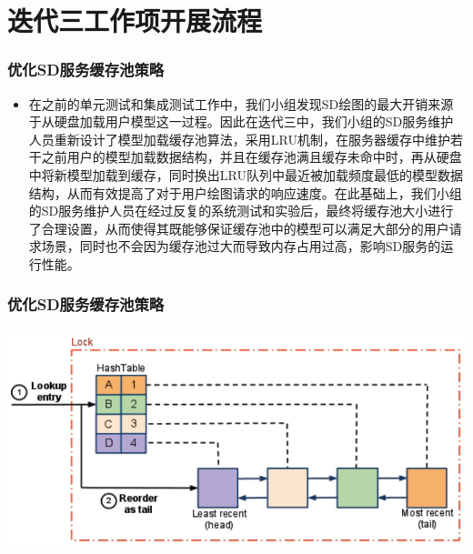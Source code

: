 \section{迭代三工作项开展流程}
\begin{frame}
    \frametitle{优化SD服务缓存池策略}
    \begin{itemize}
        \item 在之前的单元测试和集成测试工作中，我们小组发现SD绘图的最大开销来源于从硬盘加载用户模型这一过程。因此在迭代三中，我们小组的SD服务维护人员重新设计了模型加载缓存池算法，采用LRU机制，在服务器缓存中维护若干之前用户的模型加载数据结构，并且在缓存池满且缓存未命中时，再从硬盘中将新模型加载到缓存，同时换出LRU队列中最近被加载频度最低的模型数据结构，从而有效提高了对于用户绘图请求的响应速度。在此基础上，我们小组的SD服务维护人员在经过反复的系统测试和实验后，最终将缓存池大小进行了合理设置，从而使得其既能够保证缓存池中的模型可以满足大部分的用户请求场景，同时也不会因为缓存池过大而导致内存占用过高，影响SD服务的运行性能。
    \end{itemize}
\end{frame}

\begin{frame}
    \frametitle{优化SD服务缓存池策略}
    \includegraphics[width=\textwidth]{contents/figure/LRU.png}
\end{frame}
